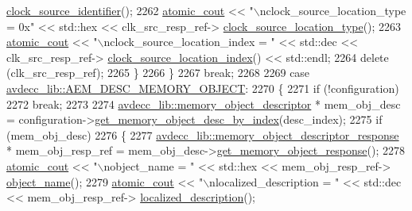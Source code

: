 \begin{DoxyCode}
      \hyperlink{classavdecc__lib_1_1clock__source__descriptor__response_a95e00a145734c8713b7bf377b8e59dcf}{clock\_source\_identifier}();
2262             \hyperlink{cmd__line_8h_a0bc38ccc65c79ba06c6fcd7b4bf554c3}{atomic\_cout} << \textcolor{stringliteral}{"\(\backslash\)nclock\_source\_location\_type = 0x"} << std::hex << clk\_src\_resp\_ref->
      \hyperlink{classavdecc__lib_1_1clock__source__descriptor__response_aeed570325d78c18b6b90bd00d68c610a}{clock\_source\_location\_type}();
2263             \hyperlink{cmd__line_8h_a0bc38ccc65c79ba06c6fcd7b4bf554c3}{atomic\_cout} << \textcolor{stringliteral}{"\(\backslash\)nclock\_source\_location\_index = "} << std::dec << clk\_src\_resp\_ref->
      \hyperlink{classavdecc__lib_1_1clock__source__descriptor__response_a4446f500b6899c943f47d25eda285fa8}{clock\_source\_location\_index}() << std::endl;
2264             \textcolor{keyword}{delete} (clk\_src\_resp\_ref);
2265         \}
2266     \}
2267     \textcolor{keywordflow}{break};
2268 
2269     \textcolor{keywordflow}{case} \hyperlink{namespaceavdecc__lib_ac7b7d227e46bc72b63ee9e9aae15902fa431f37de8bfa92a0b5353d7b741df6a2}{avdecc\_lib::AEM\_DESC\_MEMORY\_OBJECT}:
2270     \{
2271         \textcolor{keywordflow}{if} (!configuration)
2272             \textcolor{keywordflow}{break};
2273 
2274         \hyperlink{classavdecc__lib_1_1memory__object__descriptor}{avdecc\_lib::memory\_object\_descriptor} * mem\_obj\_desc = 
      configuration->\hyperlink{classavdecc__lib_1_1configuration__descriptor_aec4a4aacf26169bc5dd38bc719f4ae82}{get\_memory\_object\_desc\_by\_index}(desc\_index);
2275         \textcolor{keywordflow}{if} (mem\_obj\_desc)
2276         \{
2277             \hyperlink{classavdecc__lib_1_1memory__object__descriptor__response}{avdecc\_lib::memory\_object\_descriptor\_response} * 
      mem\_obj\_resp\_ref = mem\_obj\_desc->\hyperlink{classavdecc__lib_1_1memory__object__descriptor_ae85115ea5521b42712e2807173f9b45e}{get\_memory\_object\_response}();
2278             \hyperlink{cmd__line_8h_a0bc38ccc65c79ba06c6fcd7b4bf554c3}{atomic\_cout} << \textcolor{stringliteral}{"\(\backslash\)nobject\_name = "} << std::hex << mem\_obj\_resp\_ref->
      \hyperlink{classavdecc__lib_1_1descriptor__response__base_a133f7774946d80f82b8aaaa4cfbb7361}{object\_name}();
2279             \hyperlink{cmd__line_8h_a0bc38ccc65c79ba06c6fcd7b4bf554c3}{atomic\_cout} << \textcolor{stringliteral}{"\(\backslash\)nlocalized\_description = "} << std::dec << mem\_obj\_resp\_ref->
      \hyperlink{classavdecc__lib_1_1memory__object__descriptor__response_a1fb9de45567df344090a1407aa6b775f}{localized\_description}();

\end{DoxyCode}
